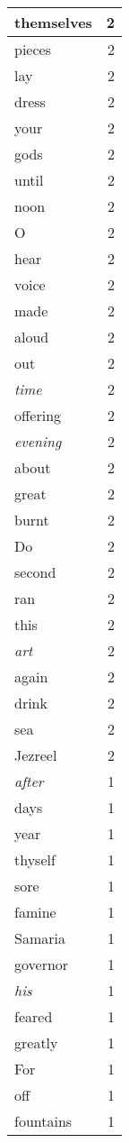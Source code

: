 \begin{center}
\begin{longtable}{l|r}
themselves & 2\\ \hline 
pieces & 2\\ \hline 
lay & 2\\ \hline 
dress & 2\\ \hline 
your & 2\\ \hline 
gods & 2\\ \hline 
until & 2\\ \hline 
noon & 2\\ \hline 
O & 2\\ \hline 
hear & 2\\ \hline 
voice & 2\\ \hline 
made & 2\\ \hline 
aloud & 2\\ \hline 
out & 2\\ \hline 
\emph{time} & 2\\ \hline 
offering & 2\\ \hline 
\emph{evening} & 2\\ \hline 
about & 2\\ \hline 
great & 2\\ \hline 
burnt & 2\\ \hline 
Do & 2\\ \hline 
second & 2\\ \hline 
ran & 2\\ \hline 
this & 2\\ \hline 
\emph{art} & 2\\ \hline 
again & 2\\ \hline 
drink & 2\\ \hline 
sea & 2\\ \hline 
Jezreel & 2\\ \hline 
\emph{after} & 1\\ \hline 
days & 1\\ \hline 
year & 1\\ \hline 
thyself & 1\\ \hline 
sore & 1\\ \hline 
famine & 1\\ \hline 
Samaria & 1\\ \hline 
governor & 1\\ \hline 
\emph{his} & 1\\ \hline 
feared & 1\\ \hline 
greatly & 1\\ \hline 
For & 1\\ \hline 
off & 1\\ \hline 
fountains & 1\\ \hline 

\end{longtable}
\end{center}
